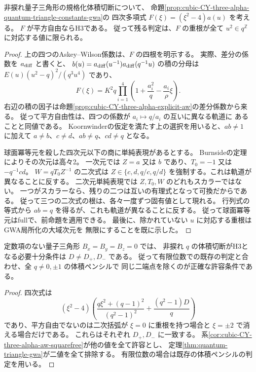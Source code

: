 \begin{corollary}\label{cor:cubic-CY-three-alpha-aw-squarefree}
非捩れ量子三角形の規格化体積切断について、
命題\ref{prop:cubic-CY-three-alpha-quantum-triangle-constants-gwa}の
四次多項式 $F(\xi)=(\xi^2-4)a(u)$ を考える。
$F$ が平方自由ならH3である。
従って残る判定は、$F$ の重根が全て $u^2\in q^{\mathbb Z}$ に対応する値に限られる。
\end{corollary}
\begin{proof}
上の四つのAskey--Wilson係数は、$F$ の四根を明示する。
実際、差分の係数を $a_{\rm diff}$ と書くと、
$b(u)=a_{\rm diff}(u^{-1})a_{\rm diff}(q^{-1}u)$ の積の分母は
$E(u)(u^2-q)^2/(q^3u^4)$ であり、
\[
 F(\xi)=K^2 q\prod_{i=1}^4
            \left(1+\frac{a_i^2}{q}-\frac{a_i}{\rho}\xi\right).
\]
右辺の積の因子は命題\ref{prop:cubic-CY-three-alpha-explicit-aw}の差分係数から来る。
従って平方自由性は、四つの係数が $a_i\mapsto q/a_i$ の互いに異なる軌道に
あることと同値である。
Koornwinderの仮定を満たす上の選択を用いると、$ab\ne1$ に加えて
$a\ne b$、$c\ne d$、$ab\ne q$、$cd\ne q$ となる。

球面冪等元を殺した四次元以下の商に単純表現があるとする。
Burnsideの定理によりその次元は高々2。
一次元では $Z=a$ 又は $b$ であり、$T_0=-1$ 又は $-q^{-1}cd$。
$W=qT_0Z^{-1}$ の二次式は
$Z\in\{c,d,q/c,q/d\}$ を強制する。これは軌道が異なることに反する。
二次元単純表現では $Z,T_0,W$ のどれもスカラーではない。
一つがスカラーなら、残りの二つは互いの有理式となって可換だからである。
従って三つの二次式の根は、各々一度ずつ固有値として現れる。
行列式の等式から $ab=q$ を得るが、これも軌道が異なることに反する。
従って球面冪等元はfullで、前命題を適用できる。
最後に、除かれていない $u$ に対応する重根はGWA局所化の大域次元を
無限にすることを既に示した。
\end{proof}

\begin{corollary}\label{cor:cubic-CY-three-alpha-constant-free-triangle-all}
定数項のない量子三角形 $B_x=B_y=B_z=0$ では、
非捩れ $q$ の体積切断がH3となる必要十分条件は $D\ne D_+,D_-$ である。
従って有限位数での既存の判定と合わせ、全 $q\ne0,\pm1$ の体積ペンシルで
同じ二端点を除くのが正確な許容条件である。
\end{corollary}
\begin{proof}
四次式は
\[
 (\xi^2-4)
 \left(\frac{q\xi^2+(q-1)^2}{(q^2-1)^2}+\frac{(q^2-1)D}{q}\right)
\]
であり、平方自由でないのは二次括弧が $\xi=0$ に重根を持つ場合と
$\xi=\pm2$ で消える場合だけである。
これらはそれぞれ $D_+,D_-$ に一致する。
系\ref{cor:cubic-CY-three-alpha-aw-squarefree}が他の値を全て許容とし、
定理\ref{thm:quantum-triangle-gwa}が二値を全て排除する。
有限位数の場合は既存の体積ペンシルの判定を用いる。
\end{proof}

